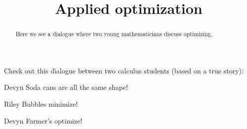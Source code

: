 \documentclass{ximera}
\title[Break-Ground:]{Applied optimization}
\begin{document}
\begin{abstract}
Here we see a dialogue where two young mathematicians discuss optimizing.
\end{abstract}
\maketitle

Check out this dialogue between two calculus students (based on a true
story):

\begin{dialogue}
\item[Devyn] Soda cans are all the same shape!
\item[Riley] Bubbles minimize!
\item[Devyn] Farmer's optimize!
\end{dialogue}


\end{document}
